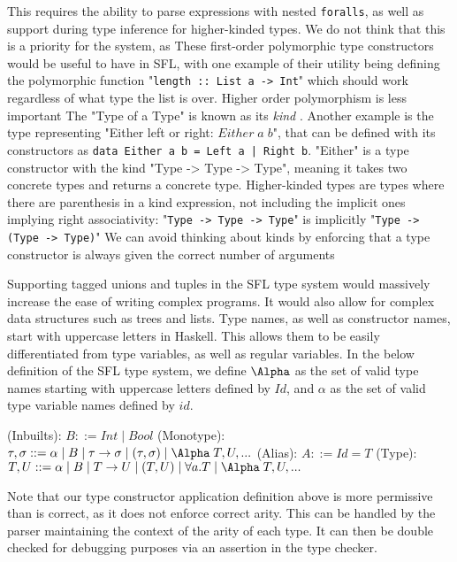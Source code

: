 This requires the ability to parse expressions with nested \verb|foralls|, as well as support during type inference for higher-kinded types. We do not think that this is a priority for the system, as 
These first-order polymorphic type constructors would be useful to have in SFL, with one example of their utility being defining the polymorphic function "\verb|length :: List a -> Int|" which should work regardless of what type the list is over. Higher order polymorphism is less important
The "Type of a Type" is known as its \emph{kind} \cite{pierce2002types}. Another example is the type representing "Either left or right: \(Either \;a\;b\)", that can be defined with its constructors as \verb!data Either a b = Left a | Right b!. "Either" is a type constructor with the kind "Type -> Type -> Type", meaning it takes two concrete types and returns a concrete type. 
Higher-kinded types are types where there are parenthesis in a kind expression, not including the implicit ones implying right associativity: 
"\verb|Type -> Type -> Type|" is implicitly "\verb|Type -> (Type -> Type)|"
We can avoid thinking about kinds by enforcing that a type constructor is always given the correct number of arguments

Supporting tagged unions and tuples in the SFL type system would massively increase the ease of writing complex programs. It would also allow for complex data structures such as trees and lists. 
Type names, as well as constructor names, start with uppercase letters in Haskell. This allows them to be easily differentiated from type variables, as well as regular variables. 
In the below definition of the SFL type system, we define \(\Alpha\) as the set of valid type names starting with uppercase letters defined by \(Id\), and \(\alpha\) as the set of valid type variable names defined by \(id\). 

\begin{syntax}
(Inbuilts): \(B::=Int\mid Bool\)\newline
(Monotype): \(\tau, \sigma ::= \alpha \mid B \mid \tau \rightarrow \sigma \mid (\tau, \sigma) \mid \Alpha \;T, U,...\)\newline
(Alias): \(A ::= Id = T\)\newline
(Type): \(T, U ::= \alpha \mid B \mid T \rightarrow U \mid (T, U) \mid \forall a. T \mid \Alpha \;T, U,...\)
\end{syntax}
Note that our type constructor application definition above is more permissive than is correct, as it does not enforce correct arity. This can be handled by the parser maintaining the context of the arity of each type. It can then be double checked for debugging purposes via an assertion in the type checker. 

